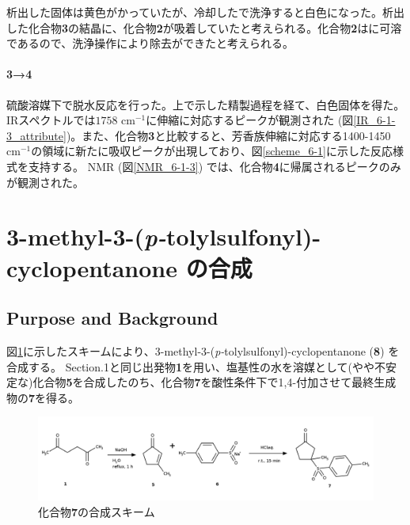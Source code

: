\documentclass{ltjsarticle}
\theoremstyle{definition}
\numberwithin{equation}{section}
\begin{document}
析出した固体は黄色がかっていたが、冷却したで洗浄すると白色になった。析出した化合物\textbf{3}の結晶に、化合物\textbf{2}が吸着していたと考えられる。化合物\textbf{2}はに可溶であるので、洗浄操作により除去ができたと考えられる。

\paragraph{\textbf{3}→\textbf{4}}
硫酸溶媒下で脱水反応を行った。上で示した精製過程を経て、白色固体を得た。IRスペクトルでは$1758$ cm$^{-1}$に伸縮に対応するピークが観測された (図\ref{IR_6-1-3_attribute})。また、化合物\textbf{3}と比較すると、芳香族伸縮に対応する1400-1450 cm$^{-1}$の領域に新たに吸収ピークが出現しており、図\ref{scheme_6-1}に示した反応様式を支持する。
 NMR (図\ref{NMR_6-1-3}) では、化合物\textbf{4}に帰属されるピークのみが観測された。


\section{3-methyl-3-(\textit{p-}tolylsulfonyl)-cyclopentanone の合成}
\subsection{Purpose and Background}
図\ref{scheme_6-2}に示したスキームにより、3-methyl-3-(\textit{p-}tolylsulfonyl)-cyclopentanone (\textbf{8}) を合成する。
Section.1と同じ出発物\textbf{1}を用い、塩基性の水を溶媒として(やや不安定な)化合物\textbf{5}を合成したのち、化合物\textbf{7}を酸性条件下で1,4-付加させて最終生成物の\textbf{7}を得る。
\begin{figure}[htbp]
\begin{center}
\includegraphics[width = 15 cm]{scheme_6-2.png}
\caption{化合物\textbf{7}の合成スキーム}%
\label{scheme_6-2}
\end{center}
\end{figure}
\end{document}
